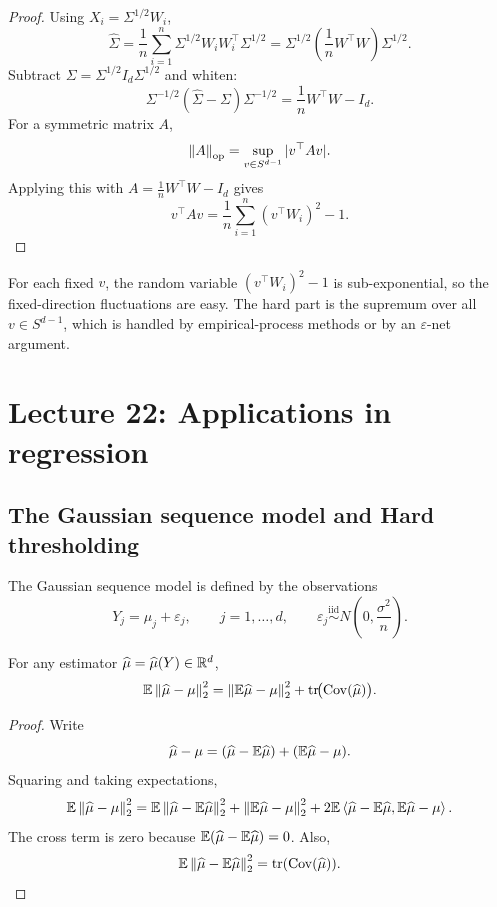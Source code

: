 \begin{proof}
Using $X_i=\Sigma^{1/2}W_i$,
\[
\widehat\Sigma
=
\frac1n\sum_{i=1}^n \Sigma^{1/2}W_iW_i^\top\Sigma^{1/2}
=
\Sigma^{1/2}\left(\frac1n W^\top W\right)\Sigma^{1/2}.
\]
Subtract $\Sigma=\Sigma^{1/2}I_d\Sigma^{1/2}$ and whiten:
\[
\Sigma^{-1/2}(\widehat\Sigma-\Sigma)\Sigma^{-1/2}
=
\frac1nW^\top W-I_d.
\]
For a symmetric matrix $A$,
\[
\left\lVert A\right\rVert_{\mathrm{op}}
=
\sup_{v\in S^{d-1}} |v^\top A v|.
\]
Applying this with $A=\frac1n W^\top W-I_d$ gives
\[
v^\top A v
=
\frac1n\sum_{i=1}^n (v^\top W_i)^2 - 1.
\]
\end{proof}

\begin{remark}
For each fixed $v$, the random variable $(v^\top W_i)^2-1$ is sub-exponential, so the fixed-direction fluctuations are easy. The hard part is the supremum over all $v\in S^{d-1}$, which is handled by empirical-process methods or by an $\varepsilon$-net argument.
\end{remark}

\section{Lecture 22: Applications in regression}
\subsection{The Gaussian sequence model and Hard thresholding}

\begin{de}
The Gaussian sequence model is defined by the observations
\[
Y_j=\mu_j+\varepsilon_j,
\qquad j=1,\dots,d,\qquad \varepsilon_j \overset{\mathrm{iid}}{\sim} N\!\left(0,\frac{\sigma^2}{n}\right).
\]
\end{de}

\begin{lem}
For any estimator $\widehat\mu=\widehat\mu(Y)\in \mathbb{R}^d$,
\[
\mathbb{E} \left\lVert\widehat\mu-\mu\right\rVert_2^2
=
\left\lVert\mathbb{E}\widehat\mu-\mu\right\rVert_2^2
+
\mathrm{tr}\!\bigl(\operatorname{Cov}(\widehat\mu)\bigr).
\]
\end{lem}

\begin{proof}
Write
\[
\widehat\mu-\mu
=
(\widehat\mu-\mathbb{E}\widehat\mu)+(\mathbb{E}\widehat\mu-\mu).
\]
Squaring and taking expectations,
\[
\mathbb{E} \left\lVert\widehat\mu-\mu\right\rVert_2^2
=
\mathbb{E} \left\lVert\widehat\mu-\mathbb{E}\widehat\mu\right\rVert_2^2
+
\left\lVert\mathbb{E}\widehat\mu-\mu\right\rVert_2^2
+
2\mathbb{E}\left\langle \widehat\mu-\mathbb{E}\widehat\mu,\mathbb{E}\widehat\mu-\mu\right\rangle.
\]
The cross term is zero because $\mathbb{E}(\widehat\mu-\mathbb{E}\widehat\mu)=0$. Also,
\[
\mathbb{E} \left\lVert\widehat\mu-\mathbb{E}\widehat\mu\right\rVert_2^2
=
\mathrm{tr}(\operatorname{Cov}(\widehat\mu)).
\]
\end{proof}

